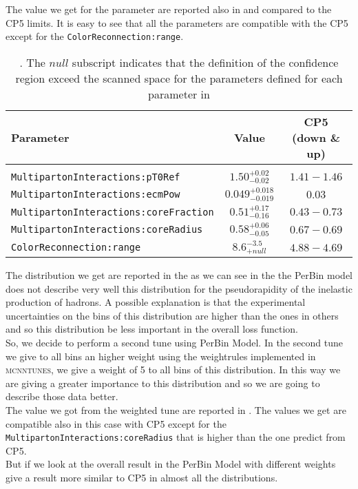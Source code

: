\noindent The value we get for the parameter are reported also in  and compared to the CP5 limits. 
It is easy to see that all the parameters are compatible with the CP5 except for the \texttt{ColorReconnection:range}. 
\begin{table}[!htb]
\centering
	\begin{tabular}{l | c | c}
		Parameter & Value & CP5 (down \& up)\\ \hline\hline
		\\[-0.85em]		
\texttt{MultipartonInteractions:pT0Ref} & $ 1.50^{+0.02}_{-0.02}$ & $1.41 - 1.46$\\[3pt]
\texttt{MultipartonInteractions:ecmPow} & $ 0.049_{-0.019}^{+0.018} $ & $0.03$\\[3pt]
\texttt{MultipartonInteractions:coreFraction} & $ 0.51_{-0.16}^{+0.17} $ & $0.43 - 0.73$\\[3pt]
\texttt{MultipartonInteractions:coreRadius} & $ 0.58_{-0.05}^{+0.06} $ & $0.67 - 0.69$\\[3pt]
\texttt{ColorReconnection:range} & $ 8.6 ^{-3.5}_{+null} $ & $4.88 - 4.69$\\[2pt]
\end{tabular}
\caption{. The $null$ subscript indicates that the definition of the confidence region exceed the scanned space for the parameters defined for each parameter in }
\label{table:result_PerBin_5params}
\end{table}

The distribution we get are reported in the  as we can see in the  the PerBin model does not describe very well this distribution for the pseudorapidity of the inelastic production of hadrons. A possible explanation is that the experimental uncertainties on the bins of this distribution are higher than the ones in others and so this distribution be less important in the overall loss function.
\\
So, we decide to perform a second tune using PerBin Model. In the second tune we give to all  bins an higher weight using the weightrules implemented in \textsc{mcnntunes}, we give a weight of 5 to all bins of this distribution. In this way we are giving a greater importance to this distribution and so we are going to describe those data better.
\\
The value we got from the weighted tune are reported in . The values we get are compatible also in this case with CP5 except for the \mbox{\texttt{MultipartonInteractions:coreRadius}} that is higher than the one predict from CP5.
\\
But if we look at the overall result in 
the PerBin Model with different weights give a result more similar to CP5 in almost all the distributions. 

